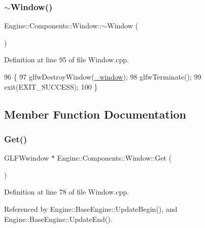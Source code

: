 \subsubsection{\texorpdfstring{$\sim$\+Window()}{~Window()}}
{\footnotesize\ttfamily Engine\+::\+Components\+::\+Window\+::$\sim$\+Window (\begin{DoxyParamCaption}{ }\end{DoxyParamCaption})}



Definition at line 95 of file Window.\+cpp.


\begin{DoxyCode}
96 \{
97     glfwDestroyWindow(\mbox{\hyperlink{classEngine_1_1Components_1_1Window_a4e37d9a51476443d15d9a395d278237a}{\_window}});
98     glfwTerminate();
99     exit(EXIT\_SUCCESS);
100 \}
\end{DoxyCode}


\subsection{Member Function Documentation}
\mbox{\label{classEngine_1_1Components_1_1Window_a4d5c3ff7df28f77bfa330beb447512f8}} 
\subsubsection{\texorpdfstring{Get()}{Get()}}
{\footnotesize\ttfamily G\+L\+F\+Wwindow $\ast$ Engine\+::\+Components\+::\+Window\+::\+Get (\begin{DoxyParamCaption}{ }\end{DoxyParamCaption})}



Definition at line 78 of file Window.\+cpp.



Referenced by Engine\+::\+Base\+Engine\+::\+Update\+Begin(), and Engine\+::\+Base\+Engine\+::\+Update\+End().


